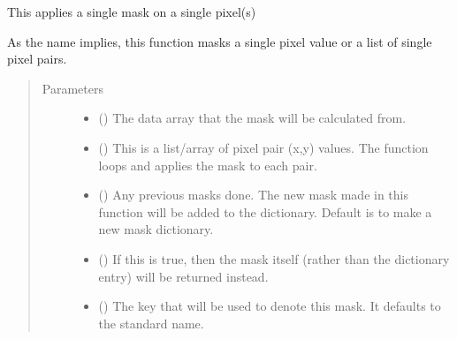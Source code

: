 \documentclass[letterpaper,10pt,english]{sphinxmanual}
\begin{document}
\begin{fulllineitems}
\label{\detokenize{python_docstrings/IfA_Smeargle.echo.masks.masks_echo300:IfA_Smeargle.echo.masks.masks_echo300.echo380_single_pixels}}
This applies a single mask on a single pixel(s)

As the name implies, this function masks a single pixel value or a list
of single pixel pairs.
\begin{quote}\begin{description}
\item[{Parameters}] \leavevmode\begin{itemize}
\item {} 
 () \textendash{} The data array that the mask will be calculated from.

\item {} 
 (\sphinxstyleliteralemphasis{\sphinxupquote{, }}) \textendash{} This is a list/array of pixel pair (x,y) values. The function loops
and applies the mask to each pair.

\item {} 
 (\sphinxstyleliteralemphasis{\sphinxupquote{ (}}\sphinxstyleliteralemphasis{\sphinxupquote{)}}) \textendash{} Any previous masks done. The new mask made in this function will be
added to the dictionary. Default is to make a new mask dictionary.

\item {} 
 (\sphinxstyleliteralemphasis{\sphinxupquote{ (}}\sphinxstyleliteralemphasis{\sphinxupquote{)}}) \textendash{} If this is true, then the mask itself (rather than the dictionary
entry) will be returned instead.

\item {} 
 (\sphinxstyleliteralemphasis{\sphinxupquote{ (}}\sphinxstyleliteralemphasis{\sphinxupquote{)}}) \textendash{} The key that will be used to denote this mask. It defaults to the
standard name.


\end{itemize}
\end{description}
\end{quote}
\end{fulllineitems}
\end{document}
